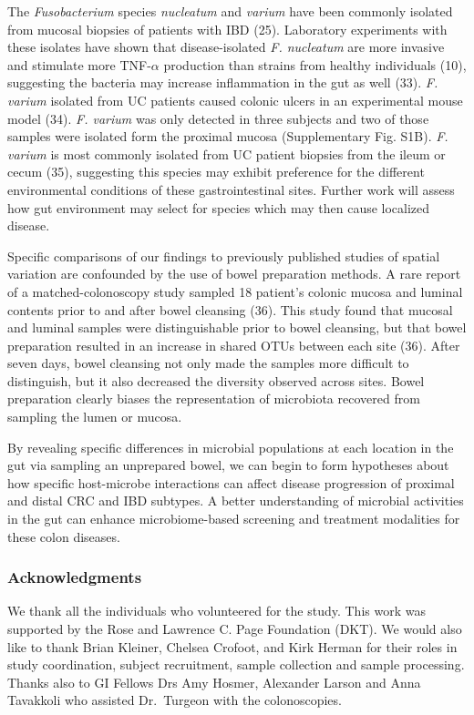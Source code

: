\documentclass[12pt,]{article}
\begin{document}
The \emph{Fusobacterium} species \emph{nucleatum} and \emph{varium} have
been commonly isolated from mucosal biopsies of patients with IBD (25).
Laboratory experiments with these isolates have shown that
disease-isolated \emph{F. nucleatum} are more invasive and stimulate
more TNF-\(\alpha\) production than strains from healthy individuals
(10), suggesting the bacteria may increase inflammation in the gut as
well (33). \emph{F. varium} isolated from UC patients caused colonic
ulcers in an experimental mouse model (34). \emph{F. varium} was only
detected in three subjects and two of those samples were isolated form
the proximal mucosa (Supplementary Fig. S1B). \emph{F. varium} is most
commonly isolated from UC patient biopsies from the ileum or cecum (35),
suggesting this species may exhibit preference for the different
environmental conditions of these gastrointestinal sites. Further work
will assess how gut environment may select for species which may then
cause localized disease.

Specific comparisons of our findings to previously published studies of
spatial variation are confounded by the use of bowel preparation
methods. A rare report of a matched-colonoscopy study sampled 18
patient's colonic mucosa and luminal contents prior to and after bowel
cleansing (36). This study found that mucosal and luminal samples were
distinguishable prior to bowel cleansing, but that bowel preparation
resulted in an increase in shared OTUs between each site (36). After
seven days, bowel cleansing not only made the samples more difficult to
distinguish, but it also decreased the diversity observed across sites.
Bowel preparation clearly biases the representation of microbiota
recovered from sampling the lumen or mucosa.

By revealing specific differences in microbial populations at each
location in the gut via sampling an unprepared bowel, we can begin to
form hypotheses about how specific host-microbe interactions can affect
disease progression of proximal and distal CRC and IBD subtypes. A
better understanding of microbial activities in the gut can enhance
microbiome-based screening and treatment modalities for these colon
diseases.

\subsubsection{Acknowledgments}\label{acknowledgments}

We thank all the individuals who volunteered for the study. This work
was supported by the Rose and Lawrence C. Page Foundation (DKT). We
would also like to thank Brian Kleiner, Chelsea Crofoot, and Kirk Herman
for their roles in study coordination, subject recruitment, sample
collection and sample processing. Thanks also to GI Fellows Drs Amy
Hosmer, Alexander Larson and Anna Tavakkoli who assisted Dr.~Turgeon
with the colonoscopies.
\end{document}
